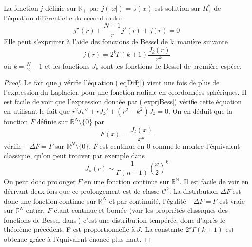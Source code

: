 \documentclass[11pt,a4paper]{article}
\begin{document}
\begin{Prop} La fonction $j$ définie sur $\mathbb{R}_+$ par $j(|x|) = J(x)$ est solution sur $R_+^*$ de l'équation différentielle du second ordre \begin{equation}
j''(r) + \frac{N-1}{r}j'(r) + j(r) = 0
\label{eqDiffj}
\end{equation}
Elle peut s'exprimer à l'aide des fonctions de Bessel de la manière suivante  \begin{equation}
j(r) = 2^{k}\Gamma(k+1)\frac{J_{k}(r)}{r^{k}}
\label{exprjBess}
\end{equation}
où $k = \frac{N}{2}-1$ et les fonctions $J_k$ sont les fonctions de Bessel de première espèce. 
\begin{proof}
Le fait que $j$ vérifie l'équation (\ref{eqDiffj}) vient une fois de plus de l'expression du Laplacien pour une fonction radiale en coordonnées sphériques. Il est facile de voir que l'expression donnée par (\ref{exprjBess}) vérifie cette équation en utilisant le fait que $r^2 J_k'' + rJ_k' + \left(r^2 - k^2\right)J_k = 0$. On en déduit que la fonction $F$ définie sur $\mathbb{R}^N\setminus{\{0\}}$ par \[F(x) = \dfrac{J_k(x)}{x^k}\] vérifie $- \Delta F = F$ sur $\mathbb{R}^N\setminus{\{0\}}$. $F$ est continue en $0$ comme le montre l'équivalent classique, qu'on peut trouver par exemple dans \cite{abramowitz1964handbook} \[J_k(r)\sim \frac{1}{\Gamma(n+1)}\left(\frac{x}{2}\right)^{k}\]
On peut donc prolonger $F$ en une fonction continue sur $\mathbb{R^N}$. Il est facile de voir en dérivant deux fois que ce prolongement est de classe $\mathcal{C}^2$. La distribution $\Delta F$ est donc une fonction continue sur $\mathbb{R}^N$ et par continuité, l'égalité $- \Delta F = F$ est vraie sur $\mathbb{R}^N$ entier. $F$ étant continue et bornée (voir les propriétés classiques des fonctions de Bessel dans \cite{abramowitz1964handbook}) c'est une distribution tempérée, donc d'après le théorème précédent, F est proportionnelle à $J$. 
La constante $2^k \Gamma(k+1)$ est obtenue grâce à l'équivalent énoncé plus haut. 
\end{proof}

\end{Prop}
\end{document}
